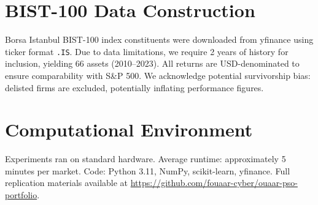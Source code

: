 \documentclass[12pt,a4paper]{article}
\begin{document}
	\appendix
	\section{BIST-100 Data Construction}
	
	Borsa Istanbul BIST-100 index constituents were downloaded from \textsf{yfinance} using ticker format \texttt{.IS}. Due to data limitations, we require 2 years of history for inclusion, yielding 66 assets (2010--2023). All returns are USD-denominated to ensure comparability with S\&P 500. We acknowledge potential survivorship bias: delisted firms are excluded, potentially inflating performance figures.
	
	\section{Computational Environment}
	
	Experiments ran on standard hardware. Average runtime: approximately 5 minutes per market. Code: Python 3.11, NumPy, scikit-learn, yfinance. Full replication materials available at \url{https://github.com/fouaar-cyber/ouaar-pso-portfolio}.
	
\end{document}
